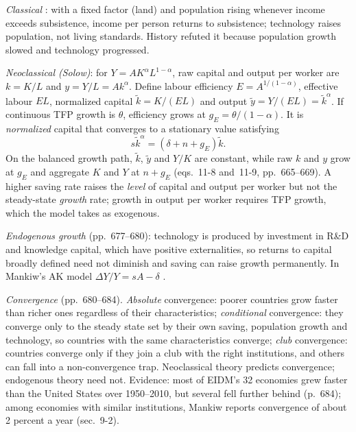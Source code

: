 \begin{qfmodel}\label{mod:growth-theories-convergence}
 \emph{Classical} \citep[chap.~11, sec.~5, pp.~664--684]{economics-investment-decision-makers-2013}: with a fixed factor (land) and population rising whenever income exceeds subsistence, income per person returns to subsistence; technology raises population, not living standards. History refuted it because population growth slowed and technology progressed.

\emph{Neoclassical (Solow)}: for $Y=AK^\alpha L^{1-\alpha}$, raw capital and output per worker are $k=K/L$ and $y=Y/L=Ak^\alpha$. Define labour efficiency $E=A^{1/(1-\alpha)}$, effective labour $EL$, normalized capital $\tilde k=K/(EL)$ and output $\tilde y=Y/(EL)=\tilde k^\alpha$. If continuous TFP growth is $\theta$, efficiency grows at $g_E=\theta/(1-\alpha)$. It is \emph{normalized} capital that converges to a stationary value satisfying
\[
s\tilde k^{\alpha}=(\delta+n+g_E)\tilde k.
\]
On the balanced growth path, $\tilde k$, $\tilde y$ and $Y/K$ are constant, while raw $k$ and $y$ grow at $g_E$ and aggregate $K$ and $Y$ at $n+g_E$ (eqs.~11-8 and~11-9, pp.~665--669). A higher saving rate raises the \emph{level} of capital and output per worker but not the steady-state \emph{growth} rate; growth in output per worker requires TFP growth, which the model takes as exogenous.

\emph{Endogenous growth} (pp.~677--680): technology is produced by investment in R\&D and knowledge capital, which have positive externalities, so returns to capital broadly defined need not diminish and saving can raise growth permanently. In Mankiw's AK model $\Delta Y/Y=sA-\delta$ \citep[chap.~9, sec.~9-4]{macroeconomics-2019}.

\emph{Convergence} (pp.~680--684). \emph{Absolute} convergence: poorer countries grow faster than richer ones regardless of their characteristics; \emph{conditional} convergence: they converge only to the steady state set by their own saving, population growth and technology, so countries with the same characteristics converge; \emph{club} convergence: countries converge only if they join a club with the right institutions, and others can fall into a non-convergence trap. Neoclassical theory predicts convergence; endogenous theory need not. Evidence: most of EIDM's 32 economies grew faster than the United States over 1950--2010, but several fell further behind (p.~684); among economies with similar institutions, Mankiw reports convergence of about 2 percent a year (sec.~9-2).


\end{qfmodel}
